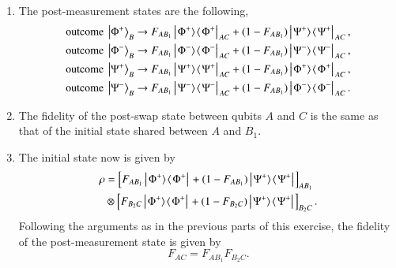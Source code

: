 \begin{solution}
\begin{enumerate}[label=(\alph*)]
\begin{equation*}
    \end{equation*}
    \item The post-measurement states are the following,
    \begin{align*}
        \text{outcome } \ket{\Phi^+}_B & \rightarrow F_{AB_1}\outp{\Phi^+}{\Phi^+}_{AC} + (1-F_{AB_1})\outp{\Psi^+}{\Psi^+}_{AC}, \\
        \text{outcome } \ket{\Phi^-}_B & \rightarrow F_{AB_1}\outp{\Phi^-}{\Phi^-}_{AC} + (1-F_{AB_1})\outp{\Psi^-}{\Psi^-}_{AC}, \\
        \text{outcome } \ket{\Psi^+}_B & \rightarrow F_{AB_1}\outp{\Psi^+}{\Psi^+}_{AC} + (1-F_{AB_1})\outp{\Phi^+}{\Phi^+}_{AC}, \\
        \text{outcome } \ket{\Psi^-}_B & \rightarrow F_{AB_1}\outp{\Psi^-}{\Psi^-}_{AC} + (1-F_{AB_1})\outp{\Phi^-}{\Phi^-}_{AC}.
    \end{align*}
    \item The fidelity of the post-swap state between qubits $A$ and $C$ is the same as that of the initial state shared between $A$ and $B_1$.
    \item The initial state now is given by
    \begin{align*}
        \rho & = \left[ F_{AB_1}\left|\left. \Phi^+ \rangle\right.\!\langle\left. \Phi^+ \right|\right.  + (1-F_{AB_1})\left|\left. \Psi^+ \rangle\right.\!\langle\left. \Psi^+ \right|\right.  \right]_{AB_1} \\
        & \otimes \left[ F_{B_2C}\left|\left. \Phi^+ \rangle\right.\!\langle\left. \Phi^+ \right|\right.  + (1-F_{B_2C})\left|\left. \Psi^+ \rangle\right.\!\langle\left. \Psi^+ \right|\right.  \right]_{B_2C}.
    \end{align*}
    Following the arguments as in the previous parts of this exercise, the fidelity of the post-measurement state is given by
    \begin{equation*}
        F_{AC} = F_{AB_1}F_{B_2C}.
    \end{equation*}
\end{enumerate}
\end{solution}

